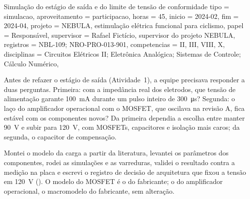 \begin{atividade}{Simulação do estágio de saída e do limite de tensão de conformidade}{
  tipo         = simulacao,
  aproveitamento = participacao,
  horas        = 45,
  inicio       = 2024-02,
  fim          = 2024-04,
  projeto      = {NEBULA, estimulação elétrica funcional para ciclismo},
  papel        = Responsável,
  supervisor   = {Rafael Fictício, supervisor do projeto NEBULA},
  registros    = {NBL-109; NRO-PRO-013-901},
  competencias = {II, III, VIII, X},
  disciplinas  = {Circuitos Elétricos II; Eletrônica Analógica; Sistemas de Controle; Cálculo Numérico},
}

\begin{contexto}
Antes de refazer o estágio de saída (Atividade~1), a equipe precisava responder a duas perguntas.
Primeira: com a impedância real dos eletrodos, que tensão de alimentação garante
\SI{100}{\milli\ampere} durante um pulso inteiro de \SI{300}{\micro\second}? Segunda: o laço do
amplificador operacional com o MOSFET, que oscilava na revisão A, fica estável com os componentes
novos? Da primeira dependia a escolha entre manter \SI{90}{\volt} e subir para \SI{120}{\volt},
com MOSFETs, capacitores e isolação mais caros; da segunda, o capacitor de compensação.
\end{contexto}

\begin{contribuicao}
Montei o modelo da carga a partir da literatura, levantei os parâmetros dos componentes, rodei as
simulações e as varreduras, validei o resultado contra a medição na placa e escrevi o registro de
decisão de arquitetura que fixou a tensão em \SI{120}{\volt} (). O modelo do
MOSFET é o do fabricante; o do amplificador operacional, o macromodelo do fabricante, sem alteração.
\end{contribuicao}

\begin{desenvolvimento}


\end{desenvolvimento}
\end{atividade}
